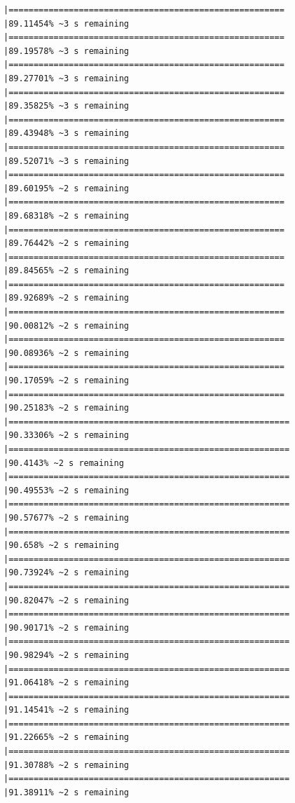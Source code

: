 \documentclass{article}\usepackage[]{graphicx}\usepackage[]{xcolor}
\makeatletter
\newenvironment{kframe}{%
 \def\at@end@of@kframe{}%
 \ifinner\ifhmode%
  \def\at@end@of@kframe{\end{minipage}}%
  \begin{minipage}{\columnwidth}%
 \fi\fi%
 \def\FrameCommand##1{\hskip\@totalleftmargin \hskip-\fboxsep
 \colorbox{shadecolor}{##1}\hskip-\fboxsep
     \hskip-\linewidth \hskip-\@totalleftmargin \hskip\columnwidth}%
 \MakeFramed {\advance\hsize-\width
   \@totalleftmargin\z@ \linewidth\hsize
   \@setminipage}}%
 {\par\unskip\endMakeFramed%
 \at@end@of@kframe}
\newenvironment{knitrout}{}{} %
\makeatother
\begin{document}
\begin{knitrout}
\begin{kframe}
\begin{verbatim}
|=======================================================       |89.11454% ~3 s remaining  
|=======================================================       |89.19578% ~3 s remaining  
|=======================================================       |89.27701% ~3 s remaining  
|=======================================================       |89.35825% ~3 s remaining  
|=======================================================       |89.43948% ~3 s remaining  
|=======================================================       |89.52071% ~3 s remaining  
|=======================================================       |89.60195% ~2 s remaining  
|=======================================================       |89.68318% ~2 s remaining  
|=======================================================       |89.76442% ~2 s remaining  
|=======================================================       |89.84565% ~2 s remaining  
|=======================================================       |89.92689% ~2 s remaining  
|=======================================================       |90.00812% ~2 s remaining  
|=======================================================       |90.08936% ~2 s remaining  
|=======================================================       |90.17059% ~2 s remaining  
|=======================================================       |90.25183% ~2 s remaining  
|========================================================      |90.33306% ~2 s remaining  
|========================================================      |90.4143% ~2 s remaining   
|========================================================      |90.49553% ~2 s remaining  
|========================================================      |90.57677% ~2 s remaining  
|========================================================      |90.658% ~2 s remaining    
|========================================================      |90.73924% ~2 s remaining  
|========================================================      |90.82047% ~2 s remaining  
|========================================================      |90.90171% ~2 s remaining  
|========================================================      |90.98294% ~2 s remaining  
|========================================================      |91.06418% ~2 s remaining  
|========================================================      |91.14541% ~2 s remaining  
|========================================================      |91.22665% ~2 s remaining  
|========================================================      |91.30788% ~2 s remaining  
|========================================================      |91.38911% ~2 s remaining  

\end{verbatim}
\end{kframe}
\end{knitrout}
\end{document}
